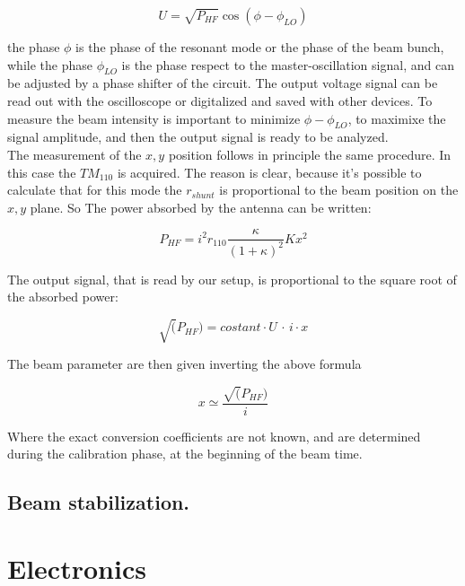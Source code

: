 \begin{equation}
U = \sqrt{P_{HF}} \cos(\phi - \phi_{LO})
\end{equation}

the phase $\phi$ is the phase of the resonant mode or the phase of the beam bunch, while the phase $\phi_{LO}$ is the phase respect to the master-oscillation signal, and can be adjusted by a phase shifter of the circuit. The output voltage signal can be read out with the oscilloscope or digitalized and saved with other devices. To measure the beam intensity is important to minimize $\phi - \phi_{LO}$, to maximixe the signal amplitude, and then the output signal is ready to be analyzed. \\
The measurement of the $x,y$ position follows in principle the same procedure. In this case the $TM_{110}$ is acquired. The reason is clear, because it's possible to calculate that for this mode the $r_{shunt}$ is proportional to the beam position on the $x,y$ plane. So The power absorbed by the antenna can be written:

\begin{equation}
P_{HF} = i^{2} r_{110} \frac{\kappa}{(1 + \kappa)^{2}} K x^{2}
\end{equation} 
 
The output signal, that is read by our setup, is proportional to the square root of the absorbed power:

\begin{equation}
\sqrt(P_{HF}) = costant \cdot U \, \cdot \, i   \cdot x
\end{equation} 

The beam parameter are then given inverting the above formula 

\begin{equation} \label{eq:SignalToVfc}
x \simeq \frac{\sqrt(P_{HF})}{i}
\end{equation}

Where the exact conversion coefficients are not known, and are determined during the calibration phase, at the beginning of the beam time.

\subsection{Beam stabilization.}

\section{Electronics}


